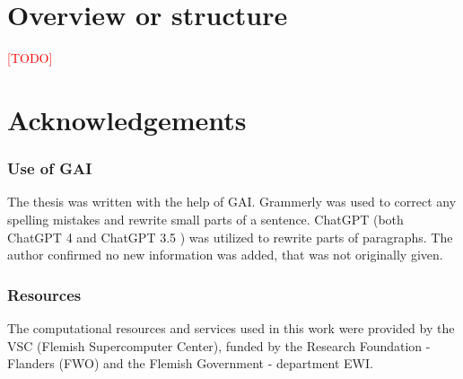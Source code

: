 \section{Overview or structure}
\textcolor{red}{[TODO]}
\section{Acknowledgements}
\subsubsection{Use of GAI}
The thesis was written with the help of GAI. Grammerly \cite{Grammarly} was used to correct any spelling mistakes and rewrite small parts of a sentence. ChatGPT (both ChatGPT 4 \cite{ChatGPT4} and ChatGPT 3.5 \cite{ChatGPT35Turbo}) was utilized to rewrite parts of paragraphs. The author confirmed no new information was added, that was not originally given. 
\subsubsection{Resources}
The computational resources and services used in this work were provided by the VSC (Flemish Supercomputer Center), funded by the Research Foundation - Flanders (FWO) and the Flemish Government - department EWI.


